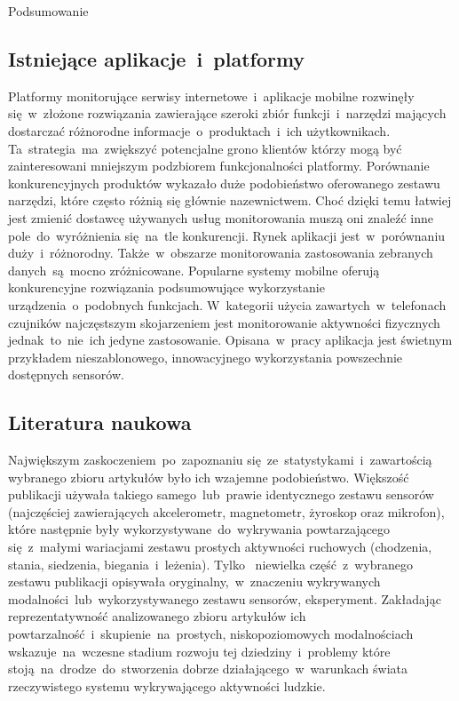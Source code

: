 \begin{chapter}{Podsumowanie}
	\subsection{Istniejące aplikacje~i~platformy}
	Platformy monitorujące serwisy internetowe~i~aplikacje mobilne rozwinęły się~w~złożone rozwiązania zawierające szeroki zbiór funkcji~i~narzędzi mających dostarczać różnorodne informacje~o~produktach~i~ich użytkownikach. Ta~strategia~ma~zwiększyć potencjalne grono klientów którzy mogą być zainteresowani mniejszym podzbiorem funkcjonalności platformy. Porównanie konkurencyjnych produktów wykazało duże podobieństwo oferowanego zestawu narzędzi, które często różnią się głównie nazewnictwem. Choć dzięki temu łatwiej jest zmienić dostawcę używanych usług monitorowania muszą oni znaleźć inne pole~do~wyróżnienia się~na~tle konkurencji. Rynek aplikacji jest~w~porównaniu duży~i~różnorodny. Także~w~obszarze monitorowania zastosowania zebranych danych~są~mocno zróżnicowane. Popularne systemy mobilne oferują konkurencyjne rozwiązania podsumowujące wykorzystanie urządzenia~o~podobnych funkcjach. W~kategorii użycia zawartych~w~telefonach czujników najczęstszym skojarzeniem jest monitorowanie aktywności fizycznych jednak~to~nie~ich jedyne zastosowanie. Opisana~w~pracy aplikacja  jest świetnym przykładem nieszablonowego, innowacyjnego wykorzystania powszechnie dostępnych sensorów.
	
	\subsection{Literatura naukowa}
	Największym zaskoczeniem~po~zapoznaniu się~ze~statystykami~i~zawartością wybranego zbioru artykułów było ich wzajemne podobieństwo. Większość publikacji używała takiego samego~lub~prawie identycznego zestawu sensorów (najczęściej zawierających akcelerometr, magnetometr, żyroskop oraz mikrofon), które następnie były wykorzystywane~do~wykrywania powtarzającego się~z~małymi wariacjami zestawu prostych aktywności ruchowych (chodzenia, stania, siedzenia, biegania~i~leżenia). Tylko~ niewielka część~z~wybranego zestawu publikacji opisywała oryginalny,~w~znaczeniu wykrywanych modalności~lub~wykorzystywanego zestawu sensorów, eksperyment. Zakładając reprezentatywność analizowanego zbioru artykułów ich powtarzalność~i~skupienie~na~prostych, niskopoziomowych modalnościach wskazuje~na~wczesne stadium rozwoju tej dziedziny~i~problemy które stoją~na~drodze~do~stworzenia dobrze działającego~w~warunkach świata rzeczywistego systemu wykrywającego aktywności ludzkie.
	

\end{chapter}
